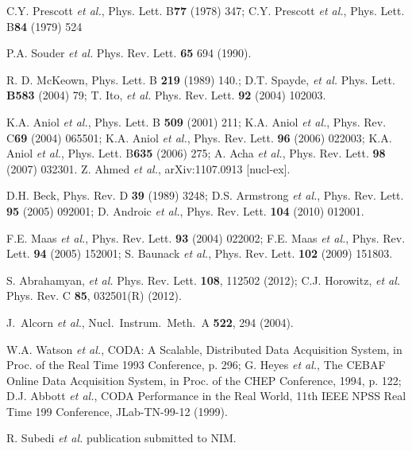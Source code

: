 \begin{thebibliography}{99} 


 C.Y. Prescott {\it et al.}, Phys. Lett. B{\bf 77} (1978) 347; C.Y. Prescott {\it et al.}, Phys. Lett. B{\bf 84} (1979) 524

 P.A. Souder {\it et al.} Phys. Rev. Lett. {\bf 65} 694 (1990).

 R. D. McKeown, Phys. Lett. B {\bf 219} (1989) 140.; 
D.T. Spayde, {\it et al.} Phys. Lett. {\bf B583} (2004) 79; 
T. Ito, {\it et al.} Phys. Rev. Lett. {\bf 92} (2004) 102003.

 K.A. Aniol {\it et al.}, Phys. Lett. B {\bf 509} (2001) 211;
K.A. Aniol {\it et al.}, Phys. Rev. C{\bf 69} (2004) 065501;
K.A. Aniol {\it et al.}, Phys. Rev. Lett. {\bf 96} (2006) 022003; 
K.A. Aniol {\it et al.}, Phys. Lett. B{\bf 635} (2006) 275;
A. Acha {\it et al.}, Phys. Rev. Lett. {\bf 98} (2007) 032301.
Z. Ahmed {\it et al.}, arXiv:1107.0913 [nucl-ex].

D.H. Beck, Phys. Rev. D {\bf 39} (1989) 3248;
D.S. Armstrong {\it et al.}, Phys. Rev. Lett. {\bf 95} (2005) 092001;
D. Androic {\it et al.}, Phys. Rev. Lett. {\bf 104} (2010) 012001.

F.E. Maas {\it et al.}, Phys. Rev. Lett. {\bf 93} (2004) 022002;
F.E. Maas {\it et al.}, Phys. Rev. Lett. {\bf 94} (2005) 152001;
S. Baunack {\it et al.}, Phys. Rev. Lett. {\bf 102} (2009) 151803.

S. Abrahamyan, {\it et al.} Phys. Rev. Lett. {\bf 108}, 112502 (2012);
C.J. Horowitz, {\it et al.} Phys. Rev. C {\bf 85}, 032501(R) (2012).

  J.~Alcorn  %
 {\it et al.},  %
  Nucl.\ Instrum.\ Meth.\ A {\bf 522}, 294 (2004).
%

 W.A. Watson {\em et al.}, 
CODA: A Scalable, Distributed
Data Acquisition System, in Proc. of
the Real Time 1993 Conference, p. 296;
G. Heyes {\em et al.}, The CEBAF Online
Data Acquisition System, in Proc. of the
CHEP Conference, 1994, p. 122;
D.J. Abbott {\em et al.}, CODA Performance
in the Real World, 11th IEEE NPSS Real Time
199 Conference, JLab-TN-99-12 (1999).

 R. Subedi {\it et al.} publication submitted to NIM.


\end{thebibliography}
